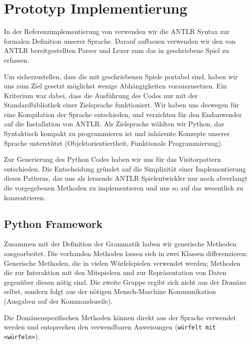 
\chapter{Prototyp Implementierung}
\label{cha:implementierung}

In der Referenzimplementierung von \dg verwenden wir die ANTLR Syntax zur formalen Definition unserer Sprache. Darauf aufbauen verwenden wir den von ANTLR bereitgestellten Parser und Lexer zum das in \dg geschriebene Spiel zu erfassen. 

Um sicherzustellen, dass die mit \dg geschriebenen Spiele portabel sind, haben wir uns zum Ziel gesetzt möglichst wenige Abhängigkeiten vorauszusetzen. 
Ein Kriterium war dabei, dass die Ausführung des Codes nur mit der Standardbibliothek einer Zielsprache funktioniert. Wir haben uns deswegen für eine Kompilation der Sprache entschieden, und verzichten für den Endanwender auf die Installation von ANTLR. Als Zielsprache wählten wir Python, das Syntaktisch kompakt zu programmieren ist und inhärente Konzepte unserer Sprache unterstützt (Objektorientiertheit, Funktionale Programmierung). 

Zur Generierung des Python Codes haben wir uns für das Visitorpattern entschieden. Die Entscheidung gründet auf die Simplizität einer Implementierung dieses Patterns, das uns als lernende ANTLR Spielentwickler nur noch abverlangt die vorgegebenen Methoden zu implementieren und uns so auf das wesentlich zu konzentrieren. 

\section{Python Framework} %
\label{sec:python_framework}
    
    Zusammen mit der Definition der Grammatik haben wir generische Methoden ausgearbeitet. Die vorhanden Methoden lassen sich in zwei Klassen differenzieren: Generische Methoden, die in vielen Würfelspielen verwendet werden; Methoden die zur Interaktion mit den Mitspielern und zur Repräsentation von Daten gegenüber diesen nötig sind. Die zweite Gruppe ergibt sich nicht aus der Domäne selbst, sondern folgt aus der nötigen Mensch-Maschine Kommunikation (Ausgaben auf der Kommandozeile).
    
    Die Domänenspezifischen Methoden können direkt aus der Sprache verwendet werden und entsprechen den verwendbaren Anweisungen (\texttt{würfelt mit <würfeln>}).
    

